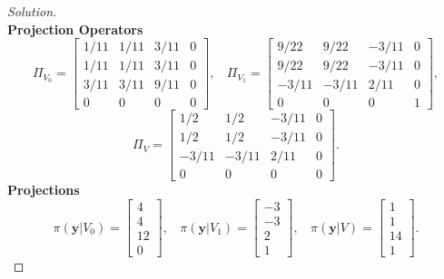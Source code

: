 \documentclass{amsart}
\begin{document}
\begin{enumerate}
\begin{proof}[Solution]
$$			$$
			\textbf{Projection Operators}
			$$\Pi_{V_{0}} = \begin{bmatrix}
					1/11 & 1/11 & 3/11 & 0 \\
					1/11 & 1/11 & 3/11 & 0 \\
					3/11 & 3/11 & 9/11 & 0 \\
					0 & 0 & 0 & 0
				\end{bmatrix},  \ \ \ \	
			\Pi_{V_{1}} = \begin{bmatrix}
				9/22 & 9/22 & -3/11 & 0 \\
				9/22 & 9/22 & -3/11 & 0 \\
				-3/11 & -3/11 & 2/11 & 0 \\
				0 & 0 & 0 & 1
			\end{bmatrix},
			$$
			$$
			\Pi_{V} = \begin{bmatrix}
				1/2 & 1/2 & -3/11 & 0 \\
				1/2 & 1/2 & -3/11 & 0 \\
				-3/11 & -3/11 & 2/11 & 0 \\
				0 & 0 & 0 & 0
			\end{bmatrix}.
			$$
			\textbf{Projections}
			$$\pi\left(\mathbf{y}|V_{0}\right) = \begin{bmatrix}
				4 \\ 4 \\ 12 \\ 0
			\end{bmatrix}, \ \ \ \
			\pi\left(\mathbf{y}|V_{1}\right) = \begin{bmatrix}
				-3 \\ -3 \\ 2 \\ 1
			\end{bmatrix}, \ \ \ \
			\pi\left(\mathbf{y}|V\right) = \begin{bmatrix}
				1 \\ 1 \\ 14 \\ 1
			\end{bmatrix}.
			$$
		\end{proof}
	\end{enumerate}
\end{document}
